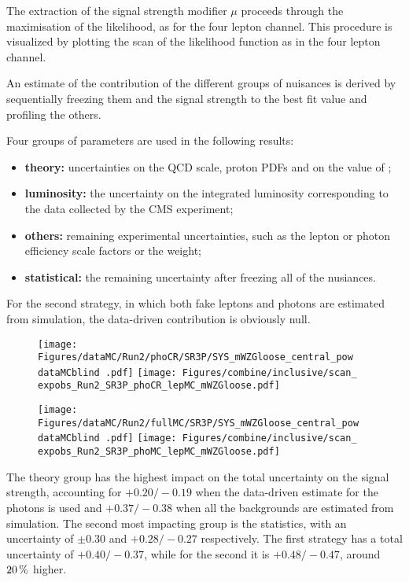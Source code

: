 The extraction of the signal strength modifier $\mu$ proceeds through the maximisation of the likelihood,
as for the four lepton channel.
This procedure is visualized by plotting the scan of the likelihood function as in the four lepton channel.

An estimate of the contribution of the different groups of nuisances is derived
by sequentially freezing them and the signal strength to the best fit value
and profiling the others.

Four groups of parameters are used in the following results:
\begin{itemize}
\item \textbf{theory:} uncertainties on the QCD scale, proton PDFs and on the value of \alpS;
\item \textbf{luminosity:} the uncertainty on the integrated luminosity corresponding to the data collected by the CMS experiment;
\item \textbf{others:} remaining experimental uncertainties, such as the lepton or photon efficiency scale factors or the \pileup{} weight;
\item \textbf{statistical:} the remaining uncertainty after freezing all of the nusiances.
\end{itemize}

For the second strategy, in which both fake leptons and photons are estimated from simulation,
the data-driven contribution is obviously null.

\begin{figure}
  \centering
  \texttt{[image: Figures/dataMC/Run2/phoCR/SR3P/SYS\_mWZGloose\_central\_pow\\dataMCblind .pdf]}
  \hfill
  \texttt{[image: Figures/combine/inclusive/scan\_\\expobs\_Run2\_SR3P\_phoCR\_lepMC\_mWZGloose.pdf]}
  \caption{}
  \label{fig:scan_Run2_SR3P_phoCR_lepMC_mWZGloose}
\end{figure}

\begin{figure}
  \centering
  \texttt{[image: Figures/dataMC/Run2/fullMC/SR3P/SYS\_mWZGloose\_central\_pow\\dataMCblind .pdf]}
  \hfill
  \texttt{[image: Figures/combine/inclusive/scan\_\\expobs\_Run2\_SR3P\_phoMC\_lepMC\_mWZGloose.pdf]}
  \caption{}
  \label{fig:scan_Run2_SR4P_phoMC_lepMC_mWZGloose}
\end{figure}

The theory group has the highest impact on the total uncertainty on the signal strength,
accounting for ${+}0.20/{-}0.19$ when the data-driven estimate for the \nonprompt photons is used
and ${+}0.37/{-}0.38$ when all the backgrounds are estimated from simulation.
The second most impacting group is the statistics, with an uncertainty of
$\pm 0.30$ and ${+}0.28/{-}0.27$ respectively.
The first strategy has a total uncertainty of ${+}0.40/{-}0.37$,
while for the second it is ${+}0.48/{-}0.47$,
around $20\usep\%$ higher.
